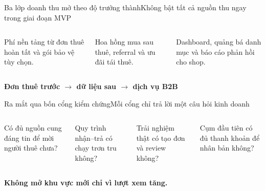 \begin{frame}{Ba lớp doanh thu mở theo độ trưởng thành}{Không bật tất cả nguồn thu ngay trong giai đoạn MVP}
  \vspace{.8em}
  \begin{columns}[T,onlytextwidth]
      \par\vspace{.45em}
      Phí nền tảng từ đơn thuê hoàn tất và gói bảo vệ tùy chọn.
      \par\vspace{.45em}
      Hoa hồng mua sau thuê, referral và ưu đãi tái thuê.
      \par\vspace{.45em}
      Dashboard, quảng bá danh mục và báo cáo phản hồi cho shop.
  \end{columns}
  \vfill
  \centering\Large\textcolor{mutuxBlue}{\textbf{Đơn thuê trước $\rightarrow$ dữ liệu sau $\rightarrow$ dịch vụ B2B}}
\end{frame}

\begin{frame}{Ra mắt qua bốn cổng kiểm chứng}{Mỗi cổng chỉ trả lời một câu hỏi kinh doanh}
  \vspace{.8em}
  \begin{columns}[T,onlytextwidth]
      \par\vspace{.35em}
      Có đủ nguồn cung đáng tin để mời người thuê chưa?
      \par\vspace{.35em}
      Quy trình nhận--trả có chạy trơn tru không?
      \par\vspace{.35em}
      Trải nghiệm thật có tạo đơn và review không?
      \par\vspace{.35em}
      Cụm đầu tiên có đủ thanh khoản để nhân bản không?
  \end{columns}
  \vfill
  \centering\textcolor{mutuxOrange}{\textbf{Không mở khu vực mới chỉ vì lượt xem tăng.}}
\end{frame}

